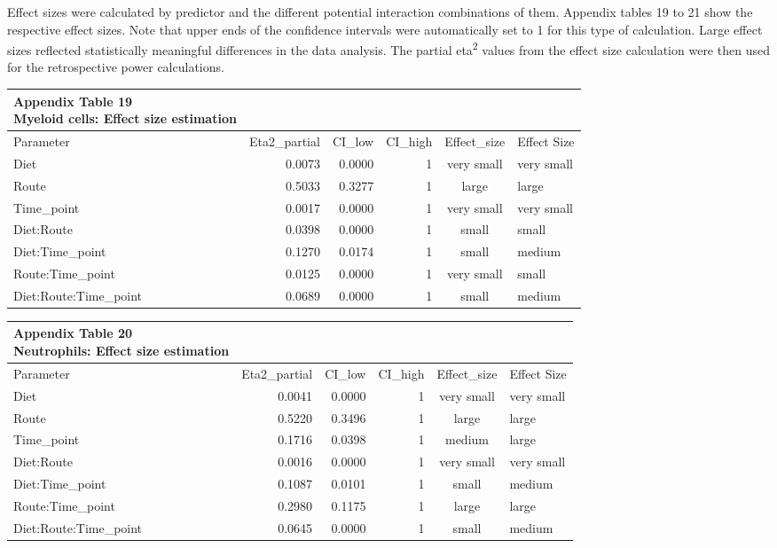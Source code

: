\documentclass[
  12pt,
  letterpaper,
]{article}
\begin{document}
Effect sizes were calculated by predictor and the different potential interaction combinations of them. Appendix tables 19 to 21 show the respective effect sizes. Note that upper ends of the confidence intervals were automatically set to 1 for this type of calculation. Large effect sizes reflected statistically meaningful differences in the data analysis. The partial eta\textsuperscript{2} values from the effect size calculation were then used for the retrospective power calculations.

\begingroup
\fontsize{12.0pt}{14.4pt}\selectfont
\begin{longtable}{lrrrcl}
\caption*{
{\large \textbf{Appendix Table 19}} \\ 
{\small \textbf{Myeloid cells: Effect size estimation}}
} \\ 
\toprule
Parameter & Eta2\_partial & CI\_low & CI\_high & Effect\_size & Effect Size \\ 
\midrule\addlinespace[2.5pt]
Diet & 0.0073 & 0.0000 & 1 & very small & very small \\ 
Route & 0.5033 & 0.3277 & 1 & large & large \\ 
Time\_point & 0.0017 & 0.0000 & 1 & very small & very small \\ 
Diet:Route & 0.0398 & 0.0000 & 1 & small & small \\ 
Diet:Time\_point & 0.1270 & 0.0174 & 1 & small & medium \\ 
Route:Time\_point & 0.0125 & 0.0000 & 1 & very small & small \\ 
Diet:Route:Time\_point & 0.0689 & 0.0000 & 1 & small & medium \\ 
\bottomrule
\end{longtable}
\endgroup

\begingroup
\fontsize{12.0pt}{14.4pt}\selectfont
\begin{longtable}{lrrrcl}
\caption*{
{\large \textbf{Appendix Table 20}} \\ 
{\small \textbf{Neutrophils: Effect size estimation}}
} \\ 
\toprule
Parameter & Eta2\_partial & CI\_low & CI\_high & Effect\_size & Effect Size \\ 
\midrule\addlinespace[2.5pt]
Diet & 0.0041 & 0.0000 & 1 & very small & very small \\ 
Route & 0.5220 & 0.3496 & 1 & large & large \\ 
Time\_point & 0.1716 & 0.0398 & 1 & medium & large \\ 
Diet:Route & 0.0016 & 0.0000 & 1 & very small & very small \\ 
Diet:Time\_point & 0.1087 & 0.0101 & 1 & small & medium \\ 
Route:Time\_point & 0.2980 & 0.1175 & 1 & large & large \\ 
Diet:Route:Time\_point & 0.0645 & 0.0000 & 1 & small & medium \\ 
\bottomrule
\end{longtable}
\endgroup
\end{document}
